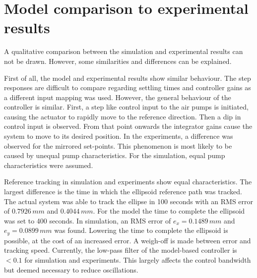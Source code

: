  

\section{Model comparison to experimental results}

A qualitative comparison between the simulation and experimental results can not be drawn. However, some similarities and differences can be explained. 

First of all, the model and experimental results show similar behaviour. The step responses are difficult to compare regarding settling times and controller gains as a different input mapping was used. However, the general behaviour of the controller is similar. First, a step like control input to the air pumps is initiated, causing the actuator to rapidly move to the reference direction. Then a dip in control input is observed. From that point onwards the integrator gains cause the system to move to its desired position. In the experiments, a difference was observed for the mirrored set-points. This phenomenon is most likely to be caused by unequal pump characteristics. For the simulation, equal pump characteristics were assumed. 

Reference tracking in simulation and experiments show equal characteristics. The largest difference is the time in which the ellipsoid reference path was tracked. The actual system was able to track the ellipse in 100 seconds with an RMS error of $0.7926  \hspace{2pt} mm$ and $0.4044 \hspace{2pt} mm$. For the model the time to complete the ellipsoid was set to 400 seconds. In simulation, an RMS error of $e_x = 0.1489  \hspace{2pt} mm$ and $e_y = 0.0899 \hspace{2pt} mm$ was found. Lowering the time to complete the ellipsoid is possible, at the cost of an increased error. A weigh-off is made between error and tracking speed. Currently, the low-pass filter of the model-based controller is $<0.1$ for simulation and experiments. This largely affects the control bandwidth but deemed necessary to reduce oscillations. 

































